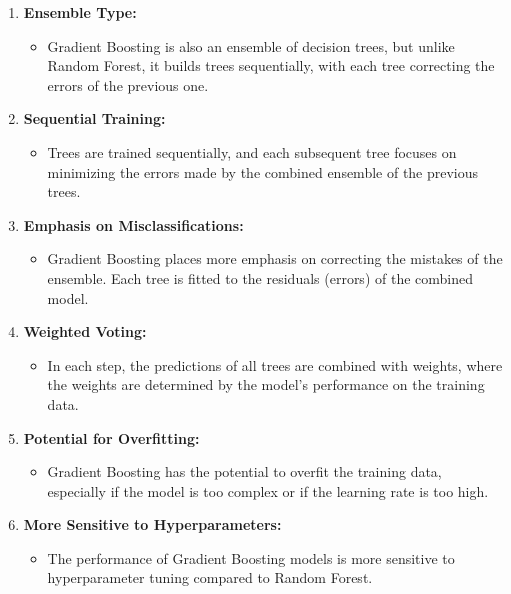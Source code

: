 \documentclass[
]{book}
\providecommand{\tightlist}{%
  \setlength{\itemsep}{0pt}\setlength{\parskip}{0pt}}
\begin{document}
\begin{enumerate}
\def\labelenumi{\arabic{enumi}.}
\tightlist
\item
  \textbf{Ensemble Type:}

  \begin{itemize}
  \tightlist
  \item
    Gradient Boosting is also an ensemble of decision trees, but unlike Random Forest, it builds trees sequentially, with each tree correcting the errors of the previous one.
  \end{itemize}
\item
  \textbf{Sequential Training:}

  \begin{itemize}
  \tightlist
  \item
    Trees are trained sequentially, and each subsequent tree focuses on minimizing the errors made by the combined ensemble of the previous trees.
  \end{itemize}
\item
  \textbf{Emphasis on Misclassifications:}

  \begin{itemize}
  \tightlist
  \item
    Gradient Boosting places more emphasis on correcting the mistakes of the ensemble. Each tree is fitted to the residuals (errors) of the combined model.
  \end{itemize}
\item
  \textbf{Weighted Voting:}

  \begin{itemize}
  \tightlist
  \item
    In each step, the predictions of all trees are combined with weights, where the weights are determined by the model's performance on the training data.
  \end{itemize}
\item
  \textbf{Potential for Overfitting:}

  \begin{itemize}
  \tightlist
  \item
    Gradient Boosting has the potential to overfit the training data, especially if the model is too complex or if the learning rate is too high.
  \end{itemize}
\item
  \textbf{More Sensitive to Hyperparameters:}

  \begin{itemize}
  \tightlist
  \item
    The performance of Gradient Boosting models is more sensitive to hyperparameter tuning compared to Random Forest.
  \end{itemize}
\end{enumerate}
\end{document}
